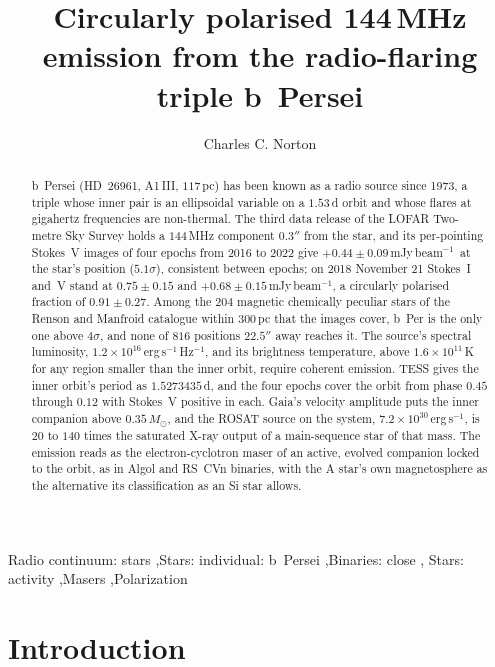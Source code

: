 \documentclass[3p,11pt]{elsarticle}
\newcommand{\mJyb}{mJy\,beam$^{-1}$}
\newcommand{\lnu}{erg\,s$^{-1}$\,Hz$^{-1}$}
\newcommand{\sci}[2]{#1\times10^{#2}}
\newcommand{\Msun}{M_\odot}
\begin{document}
\begin{frontmatter}

\title{Circularly polarised 144\,MHz emission from the radio-flaring triple b~Persei}

\author{Charles C. Norton}

\begin{abstract}
b~Persei (HD~26961, A1\,III, $117$\,pc) has been known as a radio source since 1973, a triple whose inner
pair is an ellipsoidal variable on a $1.53$\,d orbit and whose flares at gigahertz
frequencies are non-thermal. The third data release of the LOFAR Two-metre Sky Survey
holds a $144$\,MHz component $0.3''$ from the star, and its per-pointing Stokes~V images
of four epochs from 2016 to 2022 give $+0.44\pm0.09$\,\mJyb\ at the star's position
($5.1\sigma$), consistent between epochs; on 2018 November 21 Stokes~I and~V stand at
$0.75\pm0.15$ and $+0.68\pm0.15$\,\mJyb, a circularly polarised fraction of
$0.91\pm0.27$. Among the $204$ magnetic chemically peculiar stars of the Renson and
Manfroid catalogue within $300$\,pc that the images cover, b~Per is the only one above
$4\sigma$, and none of $816$ positions $22.5''$ away reaches it. The source's spectral
luminosity, $\sci{1.2}{16}$\,\lnu, and its brightness temperature, above
$\sci{1.6}{11}$\,K for any region smaller than the inner orbit, require coherent
emission. TESS gives the inner orbit's period as $1.5273435$\,d, and the four epochs
cover the orbit from phase $0.45$ through $0.12$ with Stokes~V positive in each. Gaia's velocity amplitude
puts the inner companion above $0.35\,\Msun$, and the ROSAT source on the system,
$\sci{7.2}{30}$\,erg\,s$^{-1}$, is $20$ to $140$ times the saturated X-ray output of a
main-sequence star of that mass. The emission reads as the electron-cyclotron maser of an
active, evolved companion locked to the orbit, as in Algol and RS~CVn binaries, with the
A star's own magnetosphere as the alternative its classification as an Si star allows.
\end{abstract}

\begin{keyword}
Radio continuum: stars \sep Stars: individual: b~Persei \sep Binaries: close \sep
Stars: activity \sep Masers \sep Polarization
\end{keyword}

\end{frontmatter}

\section{Introduction}\label{sec:intro}
\end{document}
